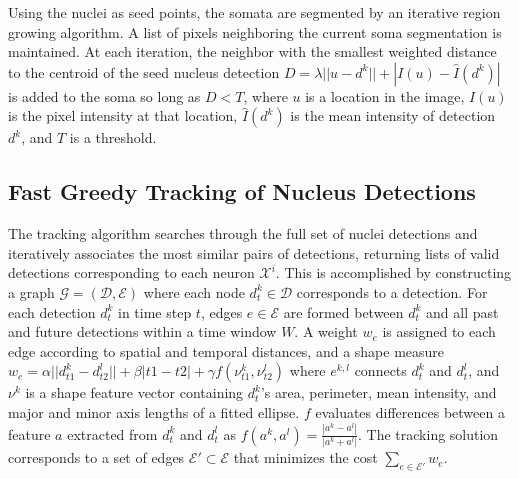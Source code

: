 Using  the nuclei  as  seed points,  the  somata are  segmented by  an
iterative region  growing algorithm. A list of  pixels neighboring the
current  soma  segmentation is  maintained.   At  each iteration,  the
neighbor with  the smallest weighted  distance to the centroid  of the
seed  nucleus  detection  $D  =  \lambda  ||  u  -  d^k||  +  |I(u)  -
\hat{I}(d^k)|$ is added to the soma so long as $D < T$, where $u$ is a
location  in the  image,  $I(u)$  is  the pixel  intensity at  that
location, $\hat{I}(d^k)$ is the mean intensity of detection $d^k$, and
$T$ is a threshold.


\vspace{-3mm}
\subsection{Fast Greedy Tracking of Nucleus Detections}
\label{sec:tracking}
\vspace{-2mm}

The tracking algorithm searches through the full set of nuclei detections
and iteratively associates the most similar  pairs of detections, returning
lists of valid detections corresponding to each neuron $\mathcal{X}^i$.
This is accomplished by constructing a graph 
$\mathcal{G}=(\mathcal{D},\mathcal{E})$  where each
node $d^k_t  \in \mathcal{D}$  corresponds to  a detection. 
For each detection $d^k_t$ in time step $t$, edges $e \in \mathcal{E}$ are formed between
$d^k_t$ and all past and future detections within a time window $W$.
A weight $w_e$ is assigned to each edge according to spatial and 
temporal distances, and a shape measure 
$w_{e} = \alpha || d^k_{t1} - d^l_{t2} ||
+ \beta |t1 - t2| + \gamma f(\nu^k_{t1}, \nu^l_{t2})$
where $e^{k,l}$ connects  $d^k_t$ and $d^l_t$, and $\nu^k$  is a shape
feature vector  containing $d^k_t$'s area,  perimeter, mean intensity,
and major  and minor axis lengths  of a fitted  ellipse. $f$ evaluates
differences between  a feature $a$ extracted from  $d^k_t$ and $d^l_t$
as  $f(a^k,a^l) =  \frac{|a^k  - a^l|}{|a^k  +  a^l|}$.  The  tracking
solution  corresponds   to  a  set  of   edges  $\mathcal{E'}  \subset
\mathcal{E}$ that minimizes the cost $\sum_{e \in \mathcal{E'}} w_e$.




